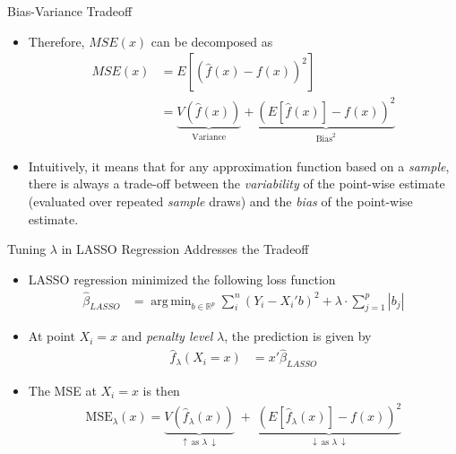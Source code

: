 \documentclass[aspectratio=1610,12pt,xcolor=dvipsnames]{beamer}
\DeclareMathOperator*{\argmin}{arg\,min}
\begin{document}
\begin{frame}{Bias-Variance Tradeoff}

\begin{itemize}
    \item Therefore, $MSE(x)$ can be decomposed as
    \begin{align*}
    MSE(x) &= E\left[\left(\hat{f}(x) - f(x)\right)^2 \right] \\
    &= \underbrace{V\left(\hat f(x)\right)}_{\text{Variance}}
       + \underbrace{\left(E[\hat f(x)] - f(x)\right)^2}_{\text{Bias}^2}
    \end{align*}
    \item Intuitively, it means that for any approximation function based on a \textit{sample},  there is always a trade-off between the \textit{variability} of the point-wise estimate (evaluated over repeated \textit{sample} draws) and the \textit{bias} of the point-wise estimate.
\end{itemize}
\end{frame}

\begin{frame}{Tuning $\lambda$ in LASSO Regression Addresses the Tradeoff}
\begin{itemize}
    \item LASSO regression minimized the following loss function
\begin{align*}
\hat \beta_{LASSO}
&= \argmin_{b\in\mathbb{R}^{p}}
\sum_{i}^n (Y_i - X_i' b)^2
+ \lambda \cdot \sum_{j=1}^{p} |b_j|
\end{align*}
    \item At point $X_i = x$ and \textit{penalty level} $\lambda$, the prediction is given by
    \begin{align*}
        \hat f_\lambda \left(X_i = x \right) &= x' \hat\beta_{LASSO}
    \end{align*}
    \item The MSE at $X_i = x$ is then
    \begin{align*}
    \mathrm{MSE}_\lambda(x)
    = \underbrace{V\left(\hat f_\lambda(x)\right)}_{\uparrow\,\text{as }\lambda\:\downarrow}
    \;+\;
    \underbrace{\left(E\left[\hat f_\lambda(x)\right]-f(x)\right)^2}_{\downarrow\,\text{as }\lambda\:\downarrow}   
    \end{align*}
\end{itemize}
\end{frame}
\end{document}
